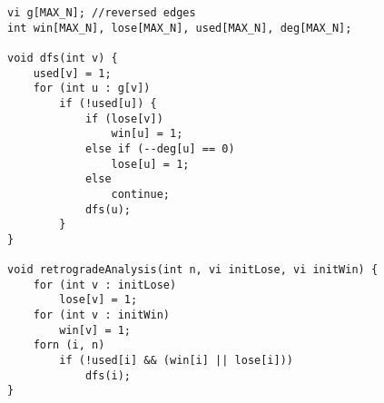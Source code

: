\begin{verbatim}
vi g[MAX_N]; //reversed edges
int win[MAX_N], lose[MAX_N], used[MAX_N], deg[MAX_N];

void dfs(int v) {
	used[v] = 1;
	for (int u : g[v])
		if (!used[u]) {
		 	if (lose[v])
		 		win[u] = 1;
		 	else if (--deg[u] == 0)
		 		lose[u] = 1;
		 	else
		 		continue;
		 	dfs(u);	
		}
}

void retrogradeAnalysis(int n, vi initLose, vi initWin) {
	for (int v : initLose)
		lose[v] = 1;
	for (int v : initWin)
		win[v] = 1;
	forn (i, n)
		if (!used[i] && (win[i] || lose[i]))
			dfs(i);
}
\end{verbatim}
	